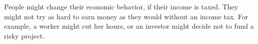 People might change their economic behavior, if their income is taxed. They might not try as hard to earn money as they would without an income tax. For example, a worker might cut her hours, or an investor might decide not to fund a risky project.
